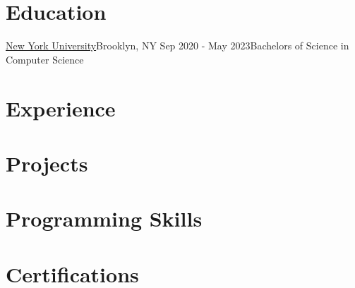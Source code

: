 \documentclass[letterpaper,11pt]{article}
\begin{document}
{}

\section{Education}
\resumeSubHeadingListStart{}
\resumeSubheading
{\href{https://engineering.nyu.edu}{New York University}}{Brooklyn, NY}
{Sep 2020 - May 2023}{Bachelors of Science in Computer Science}
\resumeSubHeadingListEnd{}

\section{Experience}
\resumeSubHeadingListStart{}

{
  
  
  
  
  
  
}

\resumeSubHeadingListEnd

\section{Projects}
\resumeSubHeadingListStart

{
  
  
  
  
  
  
  
}

\resumeSubHeadingListEnd

\section{Programming Skills}
\resumeSubHeadingListStart{}
{
  
  
}
\resumeSubHeadingListEnd{}

\section{Certifications}
\resumeSubHeadingListStart{}
{
  
  
  
  

}
\resumeSubHeadingListEnd{}

\end{document}
